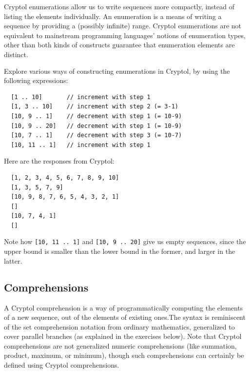 Cryptol enumerations allow us to write sequences more compactly,
instead of listing the elements individually.  An enumeration is a
means of writing a sequence by providing a (possibly infinite) range.
Cryptol enumerations are not equivalent to mainstream programming
languages' notions of enumeration types, other than both kinds of
constructs guarantee that enumeration elements are distinct.

\begin{Exercise}\label{ex:seq:3}
  Explore various ways of constructing enumerations in Cryptol, by
  using the following expressions:
\begin{Verbatim}
  [1 .. 10]       // increment with step 1
  [1, 3 .. 10]    // increment with step 2 (= 3-1)
  [10, 9 .. 1]    // decrement with step 1 (= 10-9)
  [10, 9 .. 20]   // decrement with step 1 (= 10-9)
  [10, 7 .. 1]    // decrement with step 3 (= 10-7)
  [10, 11 .. 1]   // increment with step 1
\end{Verbatim}
\end{Exercise}
\begin{Answer}
Here are the responses from Cryptol:
\begin{Verbatim}
  [1, 2, 3, 4, 5, 6, 7, 8, 9, 10]
  [1, 3, 5, 7, 9]
  [10, 9, 8, 7, 6, 5, 4, 3, 2, 1]
  []
  [10, 7, 4, 1]
  []
\end{Verbatim}
Note how \texttt{[10, 11 ..\ 1]} and \texttt{[10, 9 ..\ 20]} give us empty
sequences, since the upper bound is smaller than the lower bound in
the former, and larger in the latter.
\end{Answer}

\subsection{Comprehensions}\indComp
\label{sec:comprehensions}

A Cryptol comprehension is a way of programmatically computing the
elements of a new sequence, out of the elements of existing
ones.\indComp  The syntax is reminiscent of the set comprehension
notation from ordinary mathematics, generalized to cover parallel
branches (as explained in the exercises below).  Note that Cryptol
comprehensions are not generalized numeric comprehensions (like
summation, product, maximum, or minimum), though such comprehensions
can certainly be defined using Cryptol comprehensions.


